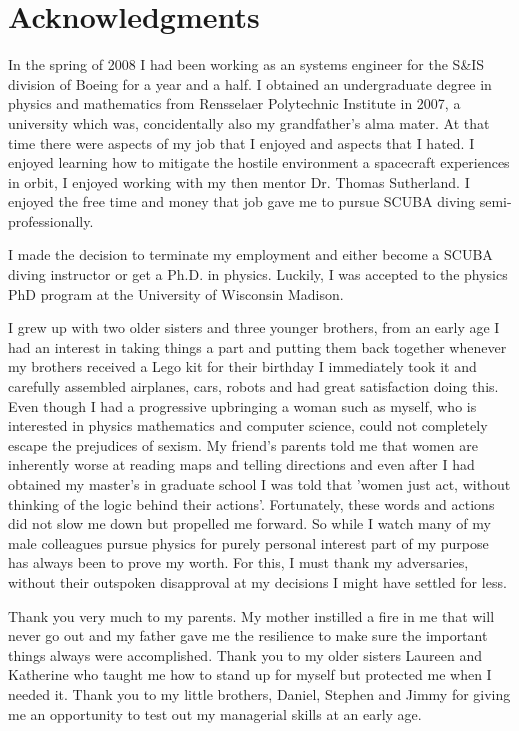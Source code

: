 \section{Acknowledgments}
In the spring of 2008 I had been working as an systems engineer for the S&IS division
of Boeing %
for a year and a half. I obtained an undergraduate degree in physics and mathematics 
from Rensselaer Polytechnic Institute in 2007, a university which was, concidentally also
my grandfather's alma mater. 
At that time there were aspects
of my job that I enjoyed and aspects that I hated. I enjoyed learning how to mitigate
the hostile environment a spacecraft experiences in orbit, I enjoyed working
with my then mentor Dr. Thomas Sutherland. I enjoyed the free time
and money that job gave me to pursue SCUBA diving semi-professionally. 

I made the decision
to terminate my employment and either become a SCUBA diving instructor or
get a Ph.D. in physics. Luckily, I was accepted to the physics PhD program at the University of Wisconsin
Madison. 

I grew up with two older sisters and three younger brothers, from an early age I had
an interest in taking things a part and putting them back together
whenever my brothers received a Lego kit for their birthday I
immediately took it and carefully assembled airplanes, cars, robots and had great
satisfaction doing this. Even though
I had a progressive upbringing a woman such as myself, who is interested in physics
mathematics and computer science, could not completely 
escape the prejudices of sexism. My friend's parents
told me that women are inherently worse at reading maps and telling 
directions and
even after I had obtained my master's in graduate school 
I was told that 'women just act, without thinking 
of the logic behind their actions'. Fortunately, these words and actions did not 
slow me down but propelled me forward. So while I watch many of my 
male colleagues pursue physics for purely personal interest part of my
purpose has always been to prove my worth. For this, I must thank my adversaries, 
without their outspoken disapproval at my decisions I might have 
settled for less. 

Thank you very much to my parents. My mother instilled a fire in me that will never 
go out and my father gave me the resilience to make sure the important things
always were accomplished. 
Thank you to my older sisters Laureen and Katherine who taught me how to stand up 
for myself but protected me when I needed it. Thank you to my little brothers, Daniel, Stephen
and Jimmy for giving me an opportunity to test out my managerial skills at an early age.

